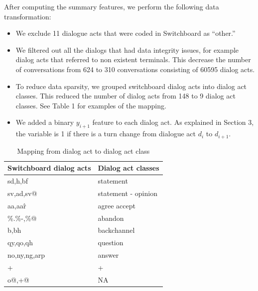    After computing the summary features, we perform the following data transformation:
    \begin{itemize}[leftmargin=1em]
    \item We exclude 11 dialogue acts that were coded in Switchboard as ``other.''
    \item We filtered out all the dialogs that had data integrity issues,  for example 
          dialog acts that referred to non existent terminals. This decrease the number
          of conversations from 624 to 310 conversations consisting of 60595 dialog acts.  
    \item To reduce data sparsity, we grouped switchboard dialog acts into dialog act classes. This reduced the number of dialog acts from 148 to 9 dialog act classes. See Table 1 for examples of the mapping.
    \item We added a binary $y_{i+1}$ feature to each dialog act. As explained in Section 3, the variable is 1 if there is a turn change from dialogue act $d_i$ to $d_{i+1}$.

    \end{itemize}
    \begin{table}
     \begin{center}
    \begin{tabular}{ |p{2cm}||p{3cm} | }
    \hline
Switchboard dialog acts &  Dialog act classes  \\
    \hline
sd,h,bf      & statement   \\
sv,ad,sv@    & statement - opinion  \\
aa,aa\^r     & agree accept \\
\%.\%-,\%@   & abandon      \\
b,bh         & backchannel  \\
qy,qo,qh     & question     \\
no,ny,ng,arp & answer       \\
+            & +            \\
o@,+@        & NA           \\
  \hline
\end{tabular}
\end{center}\vspace{-0.5em}
\caption{Mapping from dialog act to dialog act class}
\label{tab:mapping}
\end{table}
